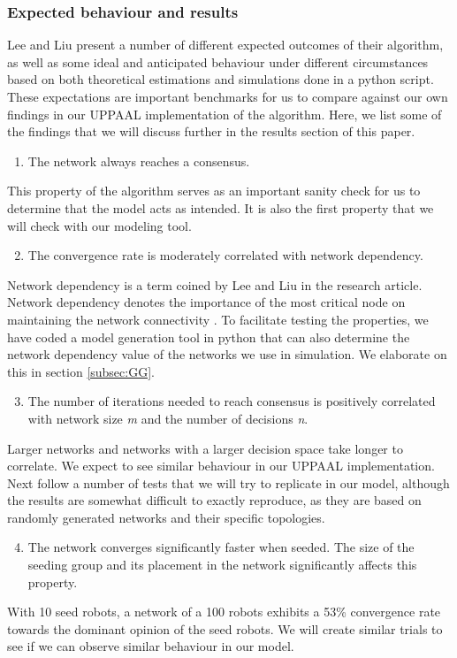 \subsubsection{Expected behaviour and results}
Lee and Liu present a number of different expected outcomes of their algorithm, as well as some ideal and anticipated behaviour under different circumstances based on both theoretical estimations and simulations done in a python script. These expectations are important benchmarks for us to compare against our own findings in our UPPAAL implementation of the algorithm. Here, we list some of the findings that we will discuss further in the results section of this paper.
\begin{enumerate}
    \item The network always reaches a consensus.
\end{enumerate}
This property of the algorithm serves as an important sanity check for us to determine that the model acts as intended. It is also the first property that we will check with our modeling tool.
\begin{enumerate}
    \setcounter{enumi}{1}
    \item The convergence rate is moderately correlated with network dependency.
\end{enumerate}
Network dependency is a term coined by Lee and Liu in the research article. Network dependency denotes the importance of the most critical node on maintaining the network connectivity \parencite[page 6]{AlgorithmPaper}. To facilitate testing the properties, we have coded a model generation tool in python that can also determine the network dependency value of the networks we use in simulation. We elaborate on this in section \ref{subsec:GG}.
\begin{enumerate}
    \setcounter{enumi}{2}
    \item The number of iterations needed to reach consensus is positively correlated with network size \textit{m} and the number of decisions \textit{n}.
\end{enumerate}
Larger networks and networks with a larger decision space take longer to correlate. We expect to see similar behaviour in our UPPAAL implementation.
Next follow a number of tests that we will try to replicate in our model, although the results are somewhat difficult to exactly reproduce, as they are based on randomly generated networks and their specific topologies.
\begin{enumerate}
    \setcounter{enumi}{3}
    \item The network converges significantly faster when seeded. The size of the seeding group and its placement in the network significantly affects this property.
\end{enumerate}
With 10 seed robots, a network of a 100 robots exhibits a 53\% convergence rate towards the dominant opinion of the seed robots. We will create similar trials to see if we can observe similar behaviour in our model.

